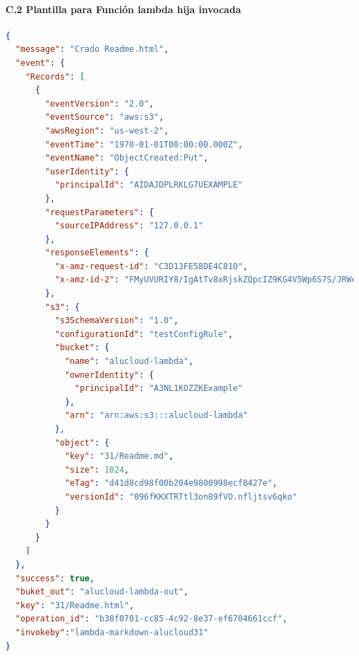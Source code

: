 \documentclass[
]{article}
\begin{document}
\hypertarget{header-n228}{%
\paragraph{C.2 Plantilla para Función lambda hija
invocada}\label{header-n228}}
\leavevmode
\newline
\begin{lstlisting}[language=json,firstnumber=1]
{
  "message": "Crado Readme.html",
  "event": {
    "Records": [
      {
        "eventVersion": "2.0",
        "eventSource": "aws:s3",
        "awsRegion": "us-west-2",
        "eventTime": "1970-01-01T00:00:00.000Z",
        "eventName": "ObjectCreated:Put",
        "userIdentity": {
          "principalId": "AIDAJDPLRKLG7UEXAMPLE"
        },
        "requestParameters": {
          "sourceIPAddress": "127.0.0.1"
        },
        "responseElements": {
          "x-amz-request-id": "C3D13FE58DE4C810",
          "x-amz-id-2": "FMyUVURIY8/IgAtTv8xRjskZQpcIZ9KG4V5Wp6S7S/JRWeUWerMUE5JgHvANOjpD"
        },
        "s3": {
          "s3SchemaVersion": "1.0",
          "configurationId": "testConfigRule",
          "bucket": {
            "name": "alucloud-lambda",
            "ownerIdentity": {
              "principalId": "A3NL1KOZZKExample"
            },
            "arn": "arn:aws:s3:::alucloud-lambda"
          },
          "object": {
            "key": "31/Readme.md",
            "size": 1024,
            "eTag": "d41d8cd98f00b204e9800998ecf8427e",
            "versionId": "096fKKXTRTtl3on89fVO.nfljtsv6qko"
          }
        }
      }
    ]
  },
  "success": true,
  "buket_out": "alucloud-lambda-out",
  "key": "31/Readme.html",
  "operation_id": "b38f0701-cc85-4c92-8e37-ef6704661ccf",
  "invokeby":"lambda-markdown-alucloud31"
}
\end{lstlisting}
\end{document}
